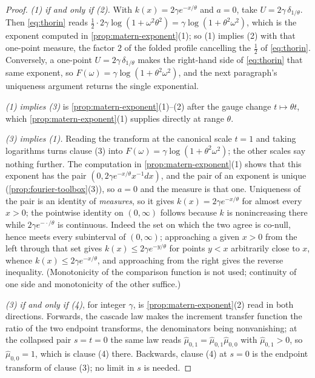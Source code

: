 \begin{proof}\leanok
\emph{(1) if and only if (2).} With $k(x) = 2\gamma e^{-x/\theta}$ and $a = 0$, take
$U = 2\gamma\,\delta_{1/\theta}$. Then \ref{eq:thorin} reads
$\tfrac12\cdot 2\gamma\log(1 + \omega^2\theta^2) = \gamma\log(1+\theta^2\omega^2)$, which is the
exponent computed in \ref{prop:matern-exponent}(1); so (1) implies (2) with that one-point
measure, the factor $2$ of the folded profile cancelling the $\tfrac12$ of \ref{eq:thorin}.
Conversely, a one-point $U = 2\gamma\,\delta_{1/\theta}$ makes the right-hand side of
\ref{eq:thorin} that same exponent, so $F(\omega) = \gamma\log(1+\theta^2\omega^2)$, and the
next paragraph's uniqueness argument returns the single exponential.

\emph{(1) implies (3)} is \ref{prop:matern-exponent}(1)--(2) after the gauge change
$t \mapsto \theta t$, which \ref{prop:matern-exponent}(1) supplies directly at range $\theta$.

\emph{(3) implies (1).} Reading the transform at the canonical scale $t = 1$ and taking
logarithms turns clause (3) into $F(\omega) = \gamma\log(1+\theta^2\omega^2)$; the other scales
say nothing further. The computation in \ref{prop:matern-exponent}(1) shows that this exponent
has the pair $(0, 2\gamma e^{-x/\theta}x^{-1}dx)$, and the pair of an exponent is unique
(\ref{prop:fourier-toolbox}(3)), so $a = 0$ and the \Levy{} measure is that one. Uniqueness of the
pair is an identity of \emph{measures}, so it gives $k(x) = 2\gamma e^{-x/\theta}$ for almost
every $x > 0$; the pointwise identity on $(0,\infty)$ follows because $k$ is nonincreasing there
while $2\gamma e^{-\cdot/\theta}$ is continuous. Indeed the set on which the two agree is
co-null, hence meets every subinterval of $(0,\infty)$; approaching a given $x > 0$ from the
left through that set gives $k(x) \le 2\gamma e^{-y/\theta}$ for points $y < x$ arbitrarily
close to $x$, whence $k(x) \le 2\gamma e^{-x/\theta}$, and approaching from the right gives the
reverse inequality. (Monotonicity of the comparison function is not used; continuity of one
side and monotonicity of the other suffice.)

\emph{(3) if and only if (4)}, for integer $\gamma$, is \ref{prop:matern-exponent}(2) read in
both directions. Forwards, the cascade law makes the increment transfer function the ratio of
the two endpoint transforms, the denominators being nonvanishing; at the collapsed pair
$s = t = 0$ the same law reads $\hat\mu_{0,1} = \hat\mu_{0,1}\hat\mu_{0,0}$ with
$\hat\mu_{0,1} > 0$, so $\hat\mu_{0,0} = 1$, which is clause (4) there. Backwards, clause (4) at
$s = 0$ is the endpoint transform of clause (3); no limit in $s$ is needed.
\end{proof}

